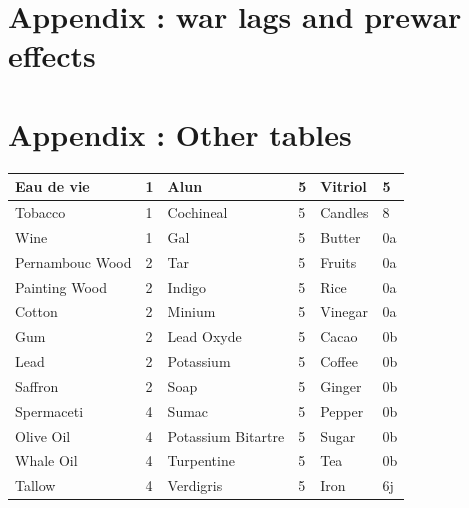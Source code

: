 \documentclass[12pt,a4paper,titlepage,english]{article}
\begin{document}
\newpage
\appendix
\section{Appendix : war lags and prewar effects}







\newpage



\newpage
\section{Appendix : Other tables}
\begin{center}

\begin{tabular}{ | l | l | l | l | l | l | }
\hline
	Eau de vie & 1 & Alun & 5 & Vitriol & 5 \\ \hline
	Tobacco & 1 & Cochineal & 5 & Candles & 8 \\ \hline
	Wine & 1 & Gal & 5 & Butter & 0a \\ \hline
	Pernambouc Wood & 2 & Tar & 5 & Fruits & 0a \\ \hline
	Painting Wood & 2 & Indigo & 5 & Rice & 0a \\ \hline
	Cotton & 2 & Minium  & 5 & Vinegar & 0a \\ \hline
	Gum & 2 & Lead Oxyde & 5 & Cacao & 0b \\ \hline
	Lead & 2 & Potassium & 5 & Coffee & 0b \\ \hline
	Saffron & 2 & Soap & 5 & Ginger & 0b \\ \hline
	Spermaceti & 4 & Sumac & 5 & Pepper & 0b \\ \hline
	Olive Oil & 4 & Potassium Bitartre & 5 & Sugar & 0b \\ \hline
	Whale Oil & 4 & Turpentine & 5 & Tea & 0b \\ \hline
	Tallow & 4 & Verdigris & 5 & Iron & 6j \\ \hline
\end{tabular}
\end{center}
\end{document}
